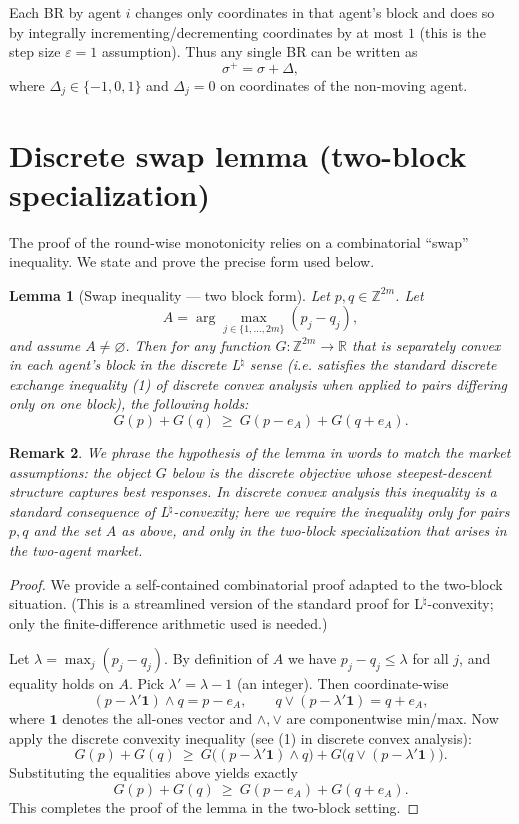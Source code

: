 \documentclass[11pt]{article}
\newtheorem{lemma}{Lemma}[section]
\newtheorem{remark}[lemma]{Remark}
\begin{document}
Each BR by agent \(i\) changes only coordinates in that agent's block
and does so by integrally incrementing/decrementing coordinates
by at most \(1\) (this is the step size \(\varepsilon=1\) assumption).
Thus any single BR can be written as
\[
\sigma^+ = \sigma + \Delta,
\]
where \(\Delta_j\in\{-1,0,1\}\) and \(\Delta_j=0\) on coordinates of
the non-moving agent.

\section{Discrete swap lemma (two-block specialization)}

The proof of the round-wise monotonicity relies on a combinatorial
``swap'' inequality. We state and prove the precise form used below.

\begin{lemma}[Swap inequality — two block form]\label{lem:swap}
Let \(p,q\in\mathbb Z^{2m}\). Let
\[
A=\arg\max_{j\in\{1,\dots,2m\}} (p_j-q_j),
\]
and assume \(A\neq\varnothing\). Then for any function
\(G:\mathbb Z^{2m}\to\mathbb R\) that is separately convex in each
agent's block in the discrete L\(^\natural\) sense (i.e. satisfies
the standard discrete exchange inequality (1) of discrete convex
analysis when applied to pairs differing only on one block),
the following holds:
\[
G(p)+G(q)\ \ge\ G(p-e_A)+G(q+e_A).
\]
\end{lemma}

\begin{remark}
We phrase the hypothesis of the lemma in words to match the market
assumptions: the object \(G\) below is the discrete objective whose
steepest-descent structure captures best responses. In discrete
convex analysis this inequality is a standard consequence of
L\(^\natural\)-convexity; here we require the inequality only for
pairs \(p,q\) and the set \(A\) as above, and only in the
two-block specialization that arises in the two-agent market.
\end{remark}

\begin{proof}
We provide a self-contained combinatorial proof adapted to the
two-block situation. (This is a streamlined version of the standard
proof for L\(^\natural\)-convexity; only the finite-difference
arithmetic used is needed.)

Let \(\lambda = \max_j (p_j-q_j)\). By definition of \(A\) we have
\(p_j-q_j\le\lambda\) for all \(j\), and equality holds on \(A\).
Pick \(\lambda'=\lambda-1\) (an integer). Then coordinate-wise
\[
(p-\lambda' \mathbf 1)\wedge q = p - e_A,
\qquad
q\vee(p-\lambda'\mathbf 1) = q + e_A,
\]
where \(\mathbf 1\) denotes the all-ones vector and \(\wedge,\vee\)
are componentwise min/max. Now apply the discrete convexity inequality
(see (1) in discrete convex analysis):
\[
G(p)+G(q)\ \ge\ G\big((p-\lambda'\mathbf 1)\wedge q\big) + 
G\big(q\vee(p-\lambda'\mathbf 1)\big).
\]
Substituting the equalities above yields exactly
\[
G(p)+G(q)\ \ge\ G(p-e_A)+G(q+e_A).
\]
This completes the proof of the lemma in the two-block setting.
\end{proof}
\end{document}
